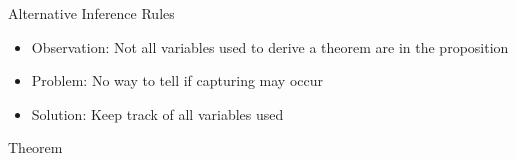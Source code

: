 \begin{frame}{Alternative Inference Rules}
    \begin{itemize}
        \item Observation: Not all variables used to derive a theorem are in the proposition
        \item Problem: No way to tell if capturing may occur
        \item Solution: Keep track of all variables used
    \end{itemize}
    \begin{center}{
     \aIv}
    \end{center}
    \begin{lemma}
    \end{lemma}
    \begin{lemma}
    \end{lemma}
    \begin{Theorem}
    \end{Theorem}
\end{frame}

\begin{frame}{ Theorem}
    \begin{theorem}
    \end{theorem}
\end{frame}

